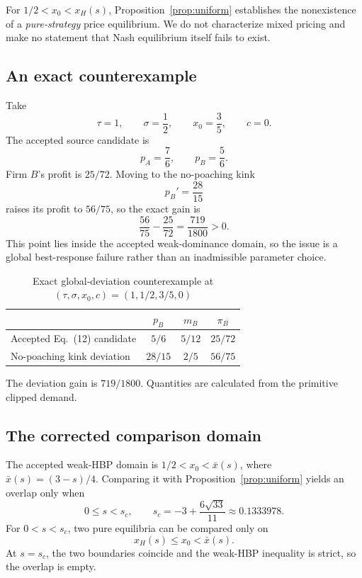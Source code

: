 \begin{remark}
For \(1/2<x_0<x_H(s)\), Proposition~\ref{prop:uniform} establishes the nonexistence of a \emph{pure-strategy} price equilibrium. We do not characterize mixed pricing and make no statement that Nash equilibrium itself fails to exist.
\end{remark}

\subsection{An exact counterexample}

Take
\[
\tau=1,\qquad
\sigma=\frac12,\qquad
x_0=\frac35,\qquad
c=0.
\]
The accepted source candidate is
\[
p_A=\frac76,\qquad p_B=\frac56.
\]
Firm \(B\)'s profit is \(25/72\). Moving to the no-poaching kink
\[
p_B'=\frac{28}{15}
\]
raises its profit to \(56/75\), so the exact gain is
\[
\frac{56}{75}-\frac{25}{72}
=
\frac{719}{1800}>0.
\]
This point lies inside the accepted weak-dominance domain, so the issue is a global best-response failure rather than an inadmissible parameter choice.

\begin{table}[t]
\centering
\caption{Exact global-deviation counterexample at \((\tau,\sigma,x_0,c)=(1,1/2,3/5,0)\)}
\label{tab:counterexample}
\begin{tabular}{lccc}
\toprule
 & \(p_B\) & \(m_B\) & \(\pi_B\)\\
\midrule
Accepted Eq.~(12) candidate & \(5/6\) & \(5/12\) & \(25/72\)\\
No-poaching kink deviation & \(28/15\) & \(2/5\) & \(56/75\)\\
\bottomrule
\end{tabular}

\smallskip
\footnotesize
The deviation gain is \(719/1800\). Quantities are calculated from the primitive clipped demand.
\end{table}

\subsection{The corrected comparison domain}

The accepted weak-HBP domain is \(1/2<x_0<\bar x(s)\), where \(\bar x(s)=(3-s)/4\). Comparing it with Proposition~\ref{prop:uniform} yields an overlap only when
\begin{equation}
0\le s<s_c,
\qquad
s_c=-3+\frac{6\sqrt{33}}{11}
\approx0.1333978.
\label{eq:sc}
\end{equation}
For \(0<s<s_c\), two pure equilibria can be compared only on
\[
x_H(s)\le x_0<\bar x(s).
\]
At \(s=s_c\), the two boundaries coincide and the weak-HBP inequality is strict, so the overlap is empty.

